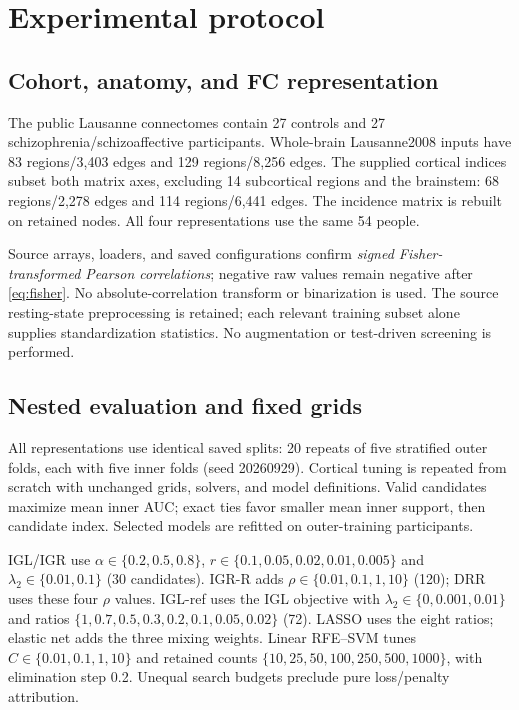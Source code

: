 \documentclass{article}
\begin{document}
\section{Experimental protocol}
\subsection{Cohort, anatomy, and FC representation}
The public Lausanne connectomes \cite{data} contain 27 controls and 27 schizophrenia/schizoaffective participants. Whole-brain Lausanne2008 inputs have 83 regions/3,403 edges and 129 regions/8,256 edges. The supplied cortical indices subset both matrix axes, excluding 14 subcortical regions and the brainstem: 68 regions/2,278 edges and 114 regions/6,441 edges. The incidence matrix is rebuilt on retained nodes. All four representations use the same 54 people.

Source arrays, loaders, and saved configurations confirm \emph{signed Fisher-transformed Pearson correlations}; negative raw values remain negative after \eqref{eq:fisher}. No absolute-correlation transform or binarization is used. The source resting-state preprocessing is retained; each relevant training subset alone supplies standardization statistics. No augmentation or test-driven screening is performed.

\subsection{Nested evaluation and fixed grids}
All representations use identical saved splits: 20 repeats of five stratified outer folds, each with five inner folds (seed 20260929). Cortical tuning is repeated from scratch with unchanged grids, solvers, and model definitions. Valid candidates maximize mean inner AUC; exact ties favor smaller mean inner support, then candidate index. Selected models are refitted on outer-training participants.

IGL/IGR use $\alpha\in\{0.2,0.5,0.8\}$, $r\in\{0.1,0.05,0.02,\allowbreak0.01,0.005\}$ and $\lambda_2\in\{0.01,0.1\}$ (30 candidates). IGR-R adds $\rho\in\{0.01,0.1,1,10\}$ (120); DRR uses these four $\rho$ values. IGL-ref uses the IGL objective with $\lambda_2\in\{0,0.001,0.01\}$ and ratios $\{1,0.7,0.5,0.3,\allowbreak0.2,0.1,0.05,0.02\}$ (72). LASSO uses the eight ratios; elastic net adds the three mixing weights. Linear RFE--SVM tunes $C\in\{0.01,0.1,1,10\}$ and retained counts $\{10,25,50,100,\allowbreak250,500,1000\}$, with elimination step 0.2. Unequal search budgets preclude pure loss/penalty attribution.
\end{document}
